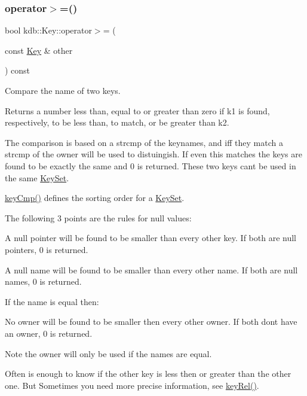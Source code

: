 \subsubsection{\texorpdfstring{operator$>$=()}{operator>=()}}
{\footnotesize\ttfamily bool kdb\+::\+Key\+::operator$>$= (\begin{DoxyParamCaption}\item[{const \hyperlink{classkdb_1_1Key}{Key} \&}]{other }\end{DoxyParamCaption}) const\hspace{0.3cm}{\ttfamily [inline]}}



Compare the name of two keys. 

\begin{DoxyReturn}{Returns}
a number less than, equal to or greater than zero if k1 is found, respectively, to be less than, to match, or be greater than k2.
\end{DoxyReturn}
The comparison is based on a strcmp of the keynames, and iff they match a strcmp of the owner will be used to distuingish. If even this matches the keys are found to be exactly the same and 0 is returned. These two keys can\textquotesingle{}t be used in the same \hyperlink{classkdb_1_1KeySet}{Key\+Set}.

\hyperlink{group__keytest_gaf6e66e12fe04d535a5d1c8218ced803e}{key\+Cmp()} defines the sorting order for a \hyperlink{classkdb_1_1KeySet}{Key\+Set}.

The following 3 points are the rules for null values\+:


\begin{DoxyItemize}
\item A null pointer will be found to be smaller than every other key. If both are null pointers, 0 is returned.
\item A null name will be found to be smaller than every other name. If both are null names, 0 is returned.
\end{DoxyItemize}

If the name is equal then\+:


\begin{DoxyItemize}
\item No owner will be found to be smaller then every other owner. If both don\textquotesingle{}t have an owner, 0 is returned.
\end{DoxyItemize}

\begin{DoxyNote}{Note}
the owner will only be used if the names are equal.
\end{DoxyNote}
Often is enough to know if the other key is less then or greater than the other one. But Sometimes you need more precise information, see \hyperlink{group__keytest_ga6bb0f95ac34ce9c42d61bb35a76139d0}{key\+Rel()}.

